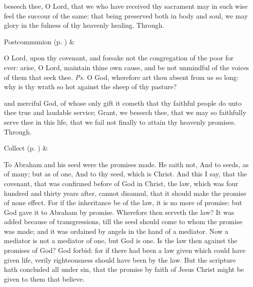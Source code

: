 
\postcommunion
{} beseech thee, O Lord, that we who have received thy sacrament may in such wise feel the succour of the same: that being preserved both in body and soul, we may glory in the fulness of thy heavenly healing. Through.
\begin{rubric}
     Postcommunion  (p. \pageref{SPSaints}) \&  
\end{rubric}


\clearpage
{}


\introit
{} O Lord, upon thy covenant, and forsake not the congregation of the poor for ever: arise, O Lord, maintain thine own cause, and be not unmindful of the voices of them that seek thee. \textit{Ps.} O God, wherefore art thou absent from us so long: why is thy wrath so hot against the sheep of thy pasture?

\collect
{} and merciful God, of whose only gift it cometh that thy faithful people do unto thee true and laudable service; Grant, we beseech thee, that we may so faithfully serve thee in this life, that we fail not finally to attain thy heavenly promises. Through.
\begin{rubric}
     Collect  (p. \pageref{SPSaints}) \&  
\end{rubric}

 To Abraham and his seed were the promises made. He saith not, And to seeds, as of many; but as of one, And to thy seed, which is Christ. And this I say, that the covenant, that was confirmed before of God in Christ, the law, which was four hundred and thirty years after, cannot disannul, that it should make the promise of none effect. For if the inheritance be of the law, it is no more of promise: but God gave it to Abraham by promise. Wherefore then serveth the law? It was added because of transgressions, till the seed should come to whom the promise was made; and it was ordained by angels in the hand of a mediator. Now a mediator is not a mediator of one, but God is one. Is the law then against the promises of God? God forbid: for if there had been a law given which could have given life, verily righteousness should have been by the law. But the scripture hath concluded all under sin, that the promise by faith of Jesus Christ might be given to them that believe.

